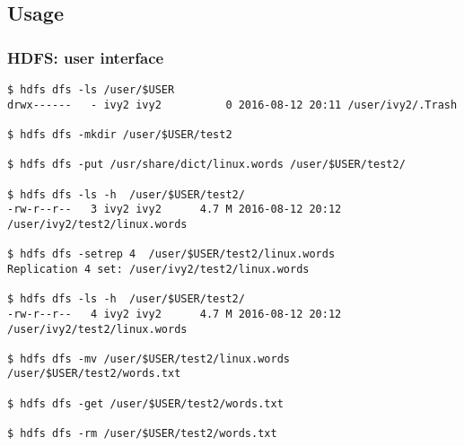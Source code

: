 \documentclass{beamer}
\begin{document}
\subsection{Usage}
\begin{frame}[fragile]
  \frametitle{HDFS: user interface}
{\color{mycolorcli}
  \begin{lstlisting}[frame=single, basicstyle=\tiny]
$ hdfs dfs -ls /user/$USER
drwx------   - ivy2 ivy2          0 2016-08-12 20:11 /user/ivy2/.Trash                                                                                                                                                                     

$ hdfs dfs -mkdir /user/$USER/test2 

$ hdfs dfs -put /usr/share/dict/linux.words /user/$USER/test2/

$ hdfs dfs -ls -h  /user/$USER/test2/
-rw-r--r--   3 ivy2 ivy2      4.7 M 2016-08-12 20:12 /user/ivy2/test2/linux.words

$ hdfs dfs -setrep 4  /user/$USER/test2/linux.words
Replication 4 set: /user/ivy2/test2/linux.words

$ hdfs dfs -ls -h  /user/$USER/test2/
-rw-r--r--   4 ivy2 ivy2      4.7 M 2016-08-12 20:12 /user/ivy2/test2/linux.words

$ hdfs dfs -mv /user/$USER/test2/linux.words /user/$USER/test2/words.txt

$ hdfs dfs -get /user/$USER/test2/words.txt

$ hdfs dfs -rm /user/$USER/test2/words.txt
  \end{lstlisting}
}


\end{frame}
\end{document}
